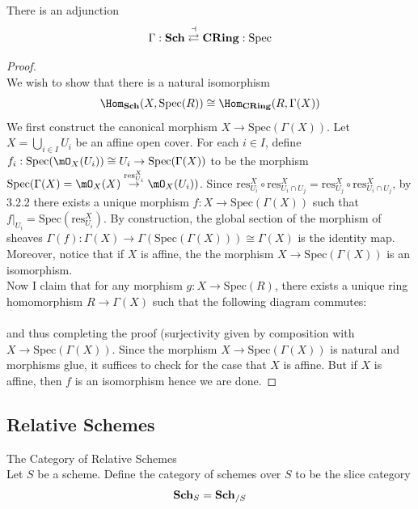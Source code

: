 \documentclass[a4paper]{article}
\begin{document}
\begin{prp}{}{}\\
There is an adjunction $$\Gamma:\bold{Sch}\overset{\dashv}{\rightleftarrows}\bold{CRing}:\text{Spec}$$
\begin{proof}\\
We wish to show that there is a natural isomorphism $$\Hom_{\bold{Sch}}(X,\text{Spec}(R))\cong\Hom_{\bold{CRing}}(R,\Gamma(X))$$ We first construct the canonical morphism $X\to\text{Spec}(\Gamma(X))$. Let $X=\bigcup_{i\in I}U_i$ be an affine open cover. For each $i\in I$, define $f_i:\text{Spec}(\mO_X(U_i))\cong U_i\to\text{Spec}(\Gamma(X))$ to be the morphism $\text{Spec}(\Gamma(X)=\mO_X(X)\overset{\text{res}_{U_i}^X}{\to}\mO_X(U_i))$. Since $\text{res}_{U_i}^X\circ\text{res}_{U_i\cap U_j}^X=\text{res}_{U_j}^X\circ\text{res}_{U_i\cap U_j}^X$, by 3.2.2 there exists a unique morphism $f:X\to\text{Spec}(\Gamma(X))$ such that $f|_{U_i}=\text{Spec}(\text{res}_{U_i}^X)$. By construction, the global section of the morphism of sheaves $\Gamma(f):\Gamma(X)\to\Gamma(\text{Spec}(\Gamma(X)))\cong\Gamma(X)$ is the identity map. Moreover, notice that if $X$ is affine, the the morphism $X\to\text{Spec}(\Gamma(X))$ is an isomorphism. \\

Now I claim that for any morphism $g:X\to\text{Spec}(R)$, there exists a unique ring homomorphism $R\to\Gamma(X)$ such that the following diagram commutes: \\
\\
and thus completing the proof (surjectivity given by composition with $X\to\text{Spec}(\Gamma(X))$. Since the morphism $X\to\text{Spec}(\Gamma(X))$ is natural and morphisms glue, it suffices to check for the case that $X$ is affine. But if $X$ is affine, then $f$ is an isomorphism hence we are done. 
\end{proof}
\end{prp}

\subsection{Relative Schemes}
\begin{defn}{The Category of Relative Schemes}{}\\
Let $S$ be a scheme. Define the category of schemes over $S$ to be the slice category $$\bold{Sch}_S=\bold{Sch}_{/S}$$
\end{defn}
\end{document}
